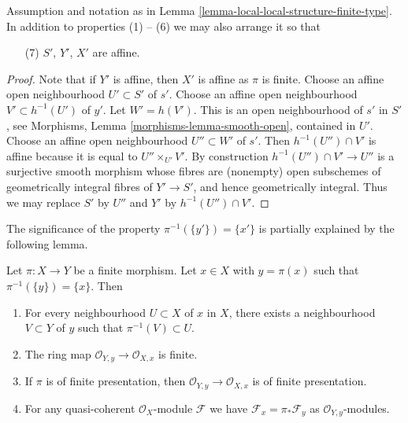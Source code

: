 \begin{lemma}
\label{lemma-local-local-structure-finite-type-affine}
Assumption and notation as in
Lemma \ref{lemma-local-local-structure-finite-type}.
In addition to properties (1) -- (6) we may also arrange it so that
\begin{enumerate}
\item[(7)] $S'$, $Y'$, $X'$ are affine.
\end{enumerate}
\end{lemma}

\begin{proof}
Note that if $Y'$ is affine, then $X'$ is affine as $\pi$ is finite.
Choose an affine open neighbourhood $U' \subset S'$ of $s'$.
Choose an affine open neighbourhood $V' \subset h^{-1}(U')$ of $y'$.
Let $W' = h(V')$. This is an open neighbourhood of $s'$ in $S'$, see
Morphisms, Lemma \ref{morphisms-lemma-smooth-open},
contained in $U'$. Choose an affine open neighbourhood $U'' \subset W'$
of $s'$. Then $h^{-1}(U'') \cap V'$ is affine because it is equal to
$U'' \times_{U'} V'$. By construction
$h^{-1}(U'') \cap V' \to U''$ is a surjective smooth morphism whose
fibres are (nonempty) open subschemes of geometrically integral fibres
of $Y' \to S'$, and hence geometrically integral. Thus we may replace
$S'$ by $U''$ and $Y'$ by $h^{-1}(U'') \cap V'$.
\end{proof}

\noindent
The significance of the property $\pi^{-1}(\{y'\}) = \{x'\}$ is partially
explained by the following lemma.

\begin{lemma}
\label{lemma-finite-morphism-single-point-in-fibre}
Let $\pi : X \to Y$ be a finite morphism.
Let $x \in X$ with $y = \pi(x)$ such that $\pi^{-1}(\{y\}) = \{x\}$.
Then
\begin{enumerate}
\item For every neighbourhood $U \subset X$ of $x$ in $X$, there
exists a neighbourhood $V \subset Y$ of $y$ such that
$\pi^{-1}(V) \subset U$.
\item The ring map $\mathcal{O}_{Y, y} \to \mathcal{O}_{X, x}$
is finite.
\item If $\pi$ is of finite presentation, then
$\mathcal{O}_{Y, y} \to \mathcal{O}_{X, x}$ is of finite presentation.
\item For any quasi-coherent $\mathcal{O}_X$-module $\mathcal{F}$
we have $\mathcal{F}_x = \pi_*\mathcal{F}_y$ as
$\mathcal{O}_{Y, y}$-modules.
\end{enumerate}
\end{lemma}

